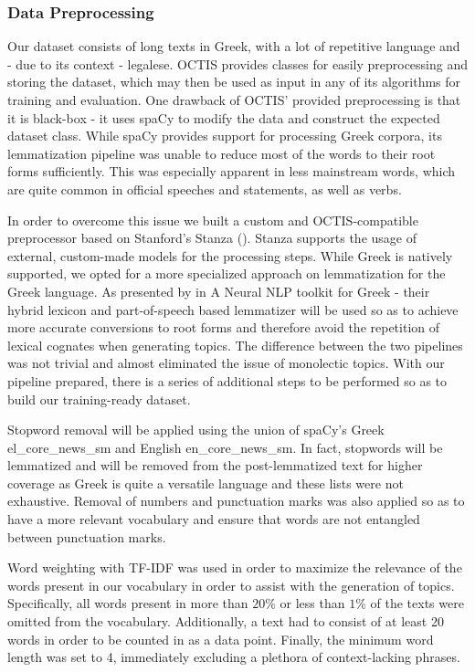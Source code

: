 \subsubsection{Data Preprocessing}
Our dataset consists of long texts in Greek, with a lot of repetitive language and - due to its context - legalese. OCTIS provides classes for easily preprocessing and storing the dataset, which may then be used as input in any of its algorithms for training and evaluation. One drawback of OCTIS' provided preprocessing is that it is black-box - it uses spaCy \citep{spacy:17} to modify the data and construct the expected dataset class. While spaCy provides support for processing Greek corpora, its lemmatization pipeline was unable to reduce most of the words to their root forms sufficiently. This was especially apparent in less mainstream words, which are quite common in official speeches and statements, as well as verbs. 

In order to overcome this issue we built a custom and OCTIS-compatible preprocessor based on Stanford's Stanza (\cite{Stanza:20}). Stanza supports the usage of external, custom-made models for the processing steps. While Greek is natively supported, we opted for a more specialized approach on lemmatization for the Greek language. As presented by \cite{Prokopidis;Piperidis:20} in A Neural NLP toolkit for Greek - their hybrid lexicon and part-of-speech based lemmatizer will be used so as to achieve more accurate conversions to root forms and therefore avoid the repetition of lexical cognates when generating topics. The difference between the two pipelines was not trivial and almost eliminated the issue of monolectic topics. With our pipeline prepared, there is a series of additional steps to be performed so as to build our training-ready dataset. 


Stopword removal will be applied using the union of spaCy's Greek el\_core\_news\_sm and English en\_core\_news\_sm. In fact, stopwords will be lemmatized and will be removed from the post-lemmatized text for higher coverage as Greek is quite a versatile language and these lists were not exhaustive. Removal of numbers and punctuation marks was also applied so as to have a more relevant vocabulary and ensure that words are not entangled between punctuation marks.

Word weighting with TF-IDF was used in order to maximize the relevance of the words present in our vocabulary in order to assist with the generation of topics. Specifically, all words present in more than $20\%$ or less than $1\%$ of the texts were omitted from the vocabulary. Additionally, a text had to consist of at least 20 words in order to be counted in as a data point. Finally, the minimum word length was set to 4, immediately excluding a plethora of context-lacking phrases. 

